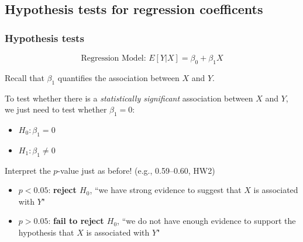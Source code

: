 \documentclass[12pt, 
hyperref={colorlinks=true, linkcolor=blue, urlcolor=cyan}]{beamer}
\begin{document}
\subsection{Hypothesis tests for regression coefficents}
\begin{frame}
\frametitle{Hypothesis tests}

$$\text{Regression Model: } E[Y|X] = \beta_0 + \beta_1 X$$

Recall that $\beta_1$ quantifies the association between $X$ and $Y$.

To test whether there is a \textit{statistically significant} association between $X$ and $Y$, \color{blue} we just need to test whether $\beta_1 = 0$: \vspace{-0.3cm} \color{black}
\begin{itemize}
\item $H_0: \beta_1 = 0$
\item $H_1: \beta_1 \not= 0$
\end{itemize}

\pause
Interpret the $p$-value just as before! (e.g., 0.59--0.60, HW2) \vspace{-0.4cm}
\begin{small}
\begin{itemize} \itemsep -2pt
\item $p < 0.05$: \textbf{reject $H_0$}, ``we have strong evidence to suggest that $X$ is associated with $Y$"
\item $p > 0.05$: \textbf{fail to reject $H_0$}, ``we do not have enough evidence to support the hypothesis that $X$ is associated with $Y$"
\end{itemize}
\end{small}
\end{frame}

\end{document}
